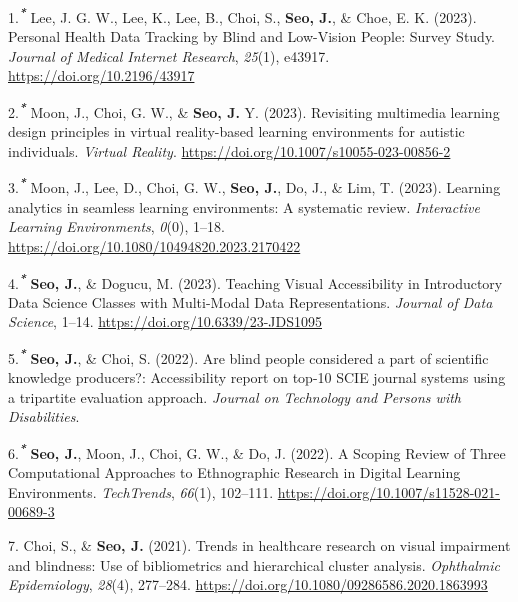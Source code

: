 \documentclass[11pt,a4paper,]{awesome-cv}
\newlength{\cslhangindent}
\newenvironment{CSLReferences}[2] %
 {\begin{list}{}{%
  \setlength{\itemindent}{0pt}
  \setlength{\leftmargin}{0pt}
  \setlength{\parsep}{0pt}
  \ifodd #1
   \setlength{\leftmargin}{\cslhangindent}
   \setlength{\itemindent}{-1\cslhangindent}
  \fi
  \setlength{\itemsep}{#2\baselineskip}}}
 {\end{list}}
\begin{document}
\label{refs-46020d03b7b38fe908a80a9add8e9ee0}
\begin{CSLReferences}{1}{0}
1.\textsuperscript{\textbf{\emph{*}}} Lee, J. G. W., Lee, K., Lee, B.,
Choi, S., \textbf{Seo, J.}, \& Choe, E. K. (2023). Personal Health Data
Tracking by Blind and Low-Vision People: Survey Study. \emph{Journal of
Medical Internet Research}, \emph{25}(1), e43917.
\url{https://doi.org/10.2196/43917}

2.\textsuperscript{\textbf{\emph{*}}} Moon, J., Choi, G. W., \&
\textbf{Seo, J.} Y. (2023). Revisiting multimedia learning design
principles in virtual reality-based learning environments for autistic
individuals. \emph{Virtual Reality}.
\url{https://doi.org/10.1007/s10055-023-00856-2}

3.\textsuperscript{\textbf{\emph{*}}} Moon, J., Lee, D., Choi, G. W.,
\textbf{Seo, J.}, Do, J., \& Lim, T. (2023). Learning analytics in
seamless learning environments: A systematic review. \emph{Interactive
Learning Environments}, \emph{0}(0), 1--18.
\url{https://doi.org/10.1080/10494820.2023.2170422}

4.\textsuperscript{\textbf{\emph{*}}} \textbf{Seo, J.}, \& Dogucu, M.
(2023). Teaching Visual Accessibility in Introductory Data Science
Classes with Multi-Modal Data Representations. \emph{Journal of Data
Science}, 1--14. \url{https://doi.org/10.6339/23-JDS1095}

5.\textsuperscript{\textbf{\emph{*}}} \textbf{Seo, J.}, \& Choi, S.
(2022). Are blind people considered a part of scientific knowledge
producers?: Accessibility report on top-10 SCIE journal systems using a
tripartite evaluation approach. \emph{Journal on Technology and Persons
with Disabilities}.

6.\textsuperscript{\textbf{\emph{*}}} \textbf{Seo, J.}, Moon, J., Choi,
G. W., \& Do, J. (2022). A Scoping Review of Three Computational
Approaches to Ethnographic Research in Digital Learning Environments.
\emph{TechTrends}, \emph{66}(1), 102--111.
\url{https://doi.org/10.1007/s11528-021-00689-3}

7. Choi, S., \& \textbf{Seo, J.} (2021). Trends in healthcare research
on visual impairment and blindness: Use of bibliometrics and
hierarchical cluster analysis. \emph{Ophthalmic Epidemiology},
\emph{28}(4), 277--284.
\url{https://doi.org/10.1080/09286586.2020.1863993}


\end{CSLReferences}
\end{document}

